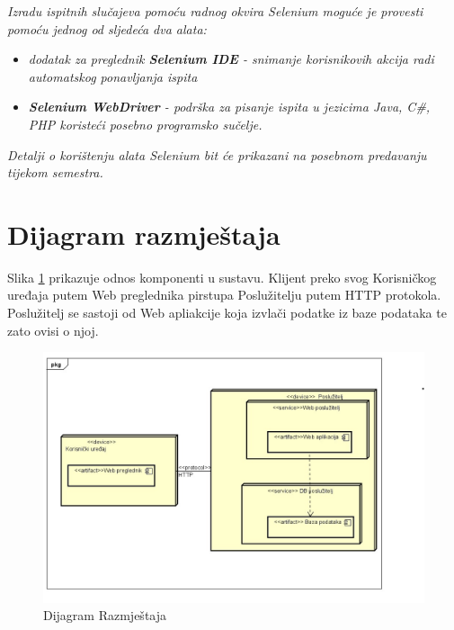 			 \textit{Izradu ispitnih slučajeva pomoću radnog okvira Selenium moguće je provesti pomoću jednog od sljedeća dva alata:}
			 \begin{itemize}
			 	\item \textit{dodatak za preglednik \textbf{Selenium IDE} - snimanje korisnikovih akcija radi automatskog ponavljanja ispita	}
			 	\item \textit{\textbf{Selenium WebDriver} - podrška za pisanje ispita u jezicima Java, C\#, PHP koristeći posebno programsko sučelje.}
			 \end{itemize}
		 	\textit{Detalji o korištenju alata Selenium bit će prikazani na posebnom predavanju tijekom semestra.}
			
			\eject 
		
		
		\section{Dijagram razmještaja}
			
			
			 Slika \ref{fig:DijRazm} prikazuje odnos komponenti u sustavu. Klijent preko svog Korisničkog uređaja putem Web preglednika pirstupa Poslužitelju putem HTTP protokola. Poslužitelj se sastoji od Web apliakcije koja izvlači podatke iz baze podataka te zato ovisi o njoj.
			 
			 \begin{figure}[H]
			 	\includegraphics[scale=0.4]{slike/dijagramRaz.jpeg} %
			 	\centering
			 	\caption{Dijagram Razmještaja}
			 	\label{fig:DijRazm}
			 \end{figure}
			
			\eject 
		
